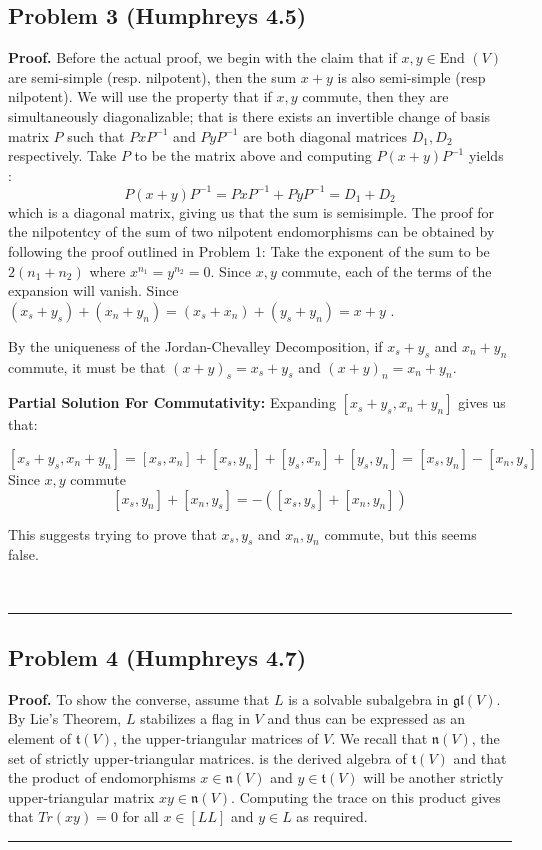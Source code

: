 \documentclass[12pt]{article}%
\newenvironment{proof}[1][Proof]{\textbf{#1.} }{\ \rule{0.5em}{0.5em}}
\begin{document}
\subsection*{Problem 3 (Humphreys 4.5)}
\begin{proof}
Before the actual proof, we begin with the claim that if $x,y \in \text{End }(V)$ are semi-simple (resp. nilpotent), then the sum $x+y$ is also semi-simple (resp nilpotent). We will use the property that if $x,y$ commute, then they are simultaneously diagonalizable; that is there exists an invertible change of basis matrix $P$ such that $PxP^{-1}$ and $PyP^{-1}$ are both diagonal matrices $D_1,D_2$ respectively. Take $P$ to be the matrix above and computing $P(x+y)P^{-1}$ yields :
$$P(x+y)P^{-1} = PxP^{-1} + PyP^{-1} = D_1 + D_2 $$ which is a diagonal matrix, giving us that the sum is semisimple. The proof for the nilpotentcy of the sum of two nilpotent endomorphisms can be obtained by following the proof outlined in Problem 1: Take the exponent of the sum to be $2(n_1 + n_2)$ where $x^{n_1} = y^{n_2} = 0$. Since $x,y$ commute, each of the terms of the expansion will vanish. \newline
Since $(x_s + y_s) + (x_n + y_n) = (x_s + x_n) + (y_s + y_n) = x + y$ .

By the uniqueness of the Jordan-Chevalley Decomposition, if $x_s + y_s$ and $x_n + y_n$ commute, it must be that $(x + y)_s = x_s + y_s$ and $(x + y)_n = x_n + y_n$.

{\bf Partial Solution For Commutativity:} Expanding $[x_s + y_s, x_n + y_n]$ gives us that:

$$ [x_s + y_s, x_n + y_n] = [x_s,x_n] + [x_s, y_n] + [y_s,x_n] + [y_s,y_n] =
[x_s,y_n] - [x_n, y_s]$$
Since $x,y$ commute
$$[x_s,y_n] + [x_n,y_s] = - ([x_s,y_s] + [x_n,y_n]) $$

This suggests trying to prove that $x_s,y_s$ and $x_n,y_n$ commute, but this seems false.


\end{proof}

\subsection*{Problem 4 (Humphreys 4.7)}
\begin{proof}
  To show the converse, assume that $L$ is a solvable subalgebra in $\mathfrak{gl}(V)$. By Lie's Theorem, $L$ stabilizes a flag in $V$ and thus can be expressed as an element of $\mathfrak{t}(V)$, the upper-triangular matrices of $V$. We recall that
  $\mathfrak{n}(V)$, the set of strictly upper-triangular matrices. is the derived algebra of $\mathfrak{t}(V)$ and that the product of endomorphisms $x \in \mathfrak{n}(V)$ and $y \in \mathfrak{t}(V)$ will be another strictly upper-triangular matrix $xy \in \mathfrak{n}(V)$. Computing the trace on this product gives that $Tr(xy) = 0$ for all $x \in [LL]$ and $y \in L$ as required.
\end{proof}
\end{document}
